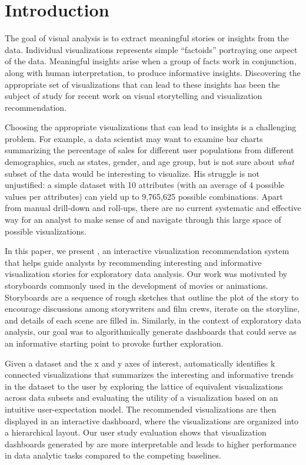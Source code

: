 \section{Introduction}


\par The goal of visual analysis is to extract meaningful stories or insights from the data. Individual visualizations represents simple ``factoids'' portraying one aspect of the data. Meaningful insights arise when a group of facts work in conjunction, along with human interpretation, to produce informative insights. Discovering the appropriate set of visualizations that can lead to these insights has been the subject of study for recent work on visual storytelling\cite{Kim2017,Hullman2017,Segel2010,Hullman2013} and visualization recommendation\cite{Vartak2015}. 
\par Choosing the appropriate visualizations that can lead to insights is a challenging problem. For example, a data scientist may want to examine bar charts summarizing the percentage of sales for different user populations from different demographics, such as states, gender, and age group, but is not sure about \textit{what} subset of the data would be interesting to visualize. His struggle is not unjustified: a simple dataset with 10 attributes (with an average of 4 possible values per attributes) can yield up to 9,765,625 possible combinations. Apart from manual drill-down and roll-ups, there are no current systematic and effective way for an analyst to make sense of and navigate through this large space of possible visualizations. %
\par In this paper, we present \system, an interactive visualization recommendation system that helps guide analysts by recommending interesting and informative visualization stories for exploratory data analysis. Our work was motivated by storyboards commonly used in the development of movies or animations. Storyboards are a sequence of rough sketches that outline the plot of the story to encourage discussions among storywriters and film crews, iterate on the storyline, and details of each scene are filled in. Similarly, in the context of exploratory data analysis, our goal was to algorithmically generate dashboards that could serve as an informative starting point to provoke further exploration.
\par Given a dataset and the x and y axes of interest, \system automatically identifies k connected visualizations that summarizes the interesting and informative trends in the dataset to the user by exploring the lattice of equivalent visualizations across data subsets and evaluating the utility of a visualization based on an intuitive user-expectation model. The recommended visualizations are then displayed in an interactive dashboard, where the visualizations are organized into a hierarchical layout. Our user study evaluation shows that visualization dashboards generated by \system are more interpretable and leads to higher performance in data analytic tasks compared to the competing baselines.
